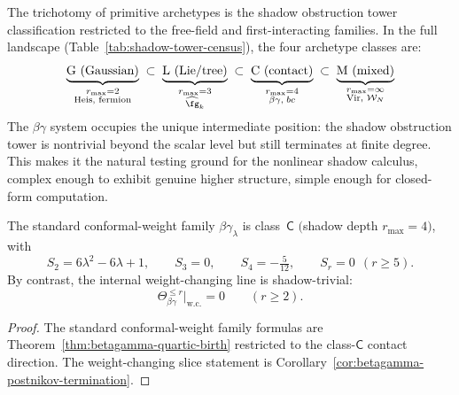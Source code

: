 \begin{remark}
\label{rem:betagamma-landscape-position}
The trichotomy of primitive archetypes is the shadow obstruction tower classification
restricted to the free-field and first-interacting families. In the
full landscape (Table~\ref{tab:shadow-tower-census}), the four
archetype classes are:
\[
\underbrace{\text{G (Gaussian)}}_{\substack{r_{\max}=2\\
\text{Heis, fermion}}} \;\subset\;
\underbrace{\text{L (Lie/tree)}}_{\substack{r_{\max}=3\\
\widehat{\fg}_k}} \;\subset\;
\underbrace{\text{C (contact)}}_{\substack{r_{\max}=4\\
\beta\gamma,\; bc}} \;\subset\;
\underbrace{\text{M (mixed)}}_{\substack{r_{\max}=\infty\\
\text{Vir, }\mathcal{W}_N}}
\]
The $\beta\gamma$ system occupies the unique intermediate position:
the shadow obstruction tower is nontrivial beyond the scalar level but still
terminates at finite degree. This makes it the natural testing ground
for the nonlinear shadow calculus, complex enough to exhibit genuine
higher structure, simple enough for closed-form computation.
\end{remark}


\begin{proposition}
\label{prop:betagamma-sugawara-class-c}
\ClaimStatusProvedHere
{}
The standard conformal-weight family $\beta\gamma_\lambda$ is class~$\mathsf{C}$
$($shadow depth $r_{\max} = 4)$, with
\[
 S_2 = 6\lambda^2 - 6\lambda + 1,\qquad
 S_3 = 0,\qquad
 S_4 = -\tfrac{5}{12},\qquad
 S_r = 0 \ \ (r \ge 5).
\]
By contrast, the internal weight-changing line is shadow-trivial:
\[
 \Theta_{\beta\gamma}^{\le r}\big|_{\mathrm{w.c.}} = 0
 \qquad (r \ge 2).
\]
\end{proposition}

\begin{proof}
The standard conformal-weight family formulas are
Theorem~\ref{thm:betagamma-quartic-birth} restricted to the
class-$\mathsf C$ contact direction. The weight-changing slice
statement is Corollary~\ref{cor:betagamma-postnikov-termination}.
\end{proof}

